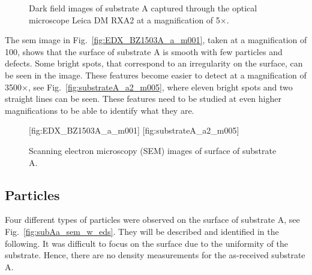 \begin{figure}[htbp]
    \centering
    \par\bigskip
    \caption[Dark field images of substrate A.]{Dark field images of substrate A captured through the optical microscope Leica DM RXA2 at a magnification of 5$\times$.}
    \label{fig:subAa_om_df}
\end{figure}

The \ac{sem} image in Fig.~\ref{fig:EDX_BZ1503A_a_m001}, taken at a magnification of 100, shows that the surface of substrate A is smooth with few particles and defects. Some bright spots, that correspond to an irregularity on the surface, can be seen in the image. These features become easier to detect at a magnification of 3500$\times$, see Fig.~\ref{fig:substrateA_a2_m005}, where eleven bright spots and two straight lines can be seen. These features need to be studied at even higher magnifications to be able to identify what they are.
\begin{figure}[htbp]
    \centering
    [fig:EDX_BZ1503A_a_m001]
    [fig:substrateA_a2_m005]
    \caption[SEM images of substrate A.]{Scanning electron microscopy (SEM) images of surface of substrate A.}
    \label{fig:subA_overview}
\end{figure}

\subsection{Particles}
Four different types of particles were observed on the surface of substrate A, see Fig.~\ref{fig:subAa_sem_w_eds}. They will be described and identified in the following. It was difficult to focus on the surface due to the uniformity of the substrate. Hence, there are no density measurements for the as-received substrate A.

